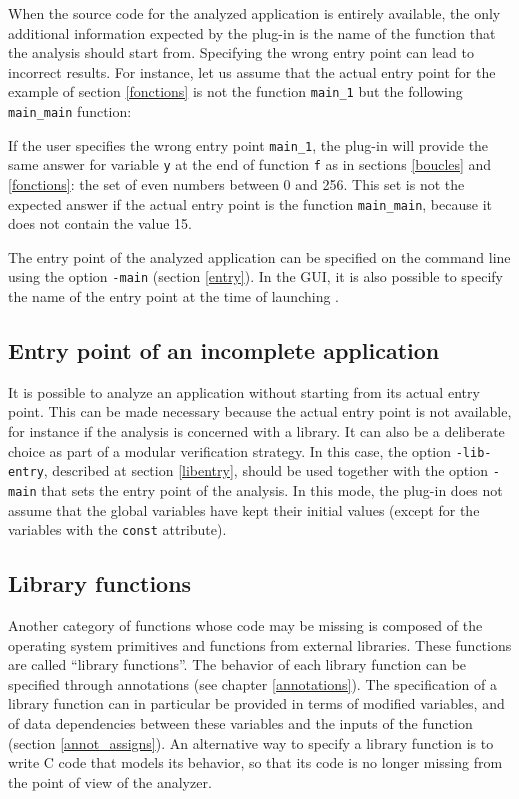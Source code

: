 \documentclass{frama-c-book}
\begin{document}
When the source code for the analyzed application is entirely
available, the only additional information expected by the plug-in is
the name of the function that the analysis should start from. Specifying the
wrong entry point can lead to incorrect results. For instance, let us
assume that the actual entry point for the example of section
\ref{fonctions} is not the function \lstinline|main_1| but the following
\lstinline|main_main| function:


If the user specifies the wrong
entry point \lstinline|main_1|, the plug-in will provide the
same answer for variable \lstinline|y| at the end of function \lstinline|f| as
in sections \ref{boucles} and \ref{fonctions}: the set of even numbers
between 0 and 256. This set is not the expected answer if the actual
entry point is the function \lstinline|main_main|, because it does not
contain the value 15.

The entry point of the analyzed application can be specified
on the command line using the option \lstinline|-main| (section \ref{entry}).
In the GUI,
it is also possible to specify the name of the entry point at
the time of launching \Eva{}.

\subsection{Entry point of an incomplete application}

It is possible to analyze an application without starting from its
actual entry point. This can be made necessary because the actual
entry point is not available, for instance if the analysis is
concerned with a library. It can also be a deliberate choice as part
of a modular verification strategy.  In this case, the option
\lstinline|-lib-entry|, described at section \ref{libentry}, should be used
together with the option \lstinline|-main| that sets the entry point of the
analysis.  In this mode, the plug-in does not assume that the global
variables have kept their initial values (except for the variables
with the \lstinline|const| attribute).

\subsection{Library functions}

Another category of functions whose code may be missing is composed
of the operating system primitives and functions from external libraries.
These functions are called ``library functions''.
The behavior of each library function can be specified through
annotations (see chapter \ref{annotations}).
The specification of a library function can in particular be
provided in terms of modified variables, and of data dependencies
between these variables and the inputs of the function
(section \ref{annot_assigns}). An alternative way to specify
a library function is to write C code that models its behavior,
so that its code is no longer missing from the point of view of the
analyzer.
\end{document}
